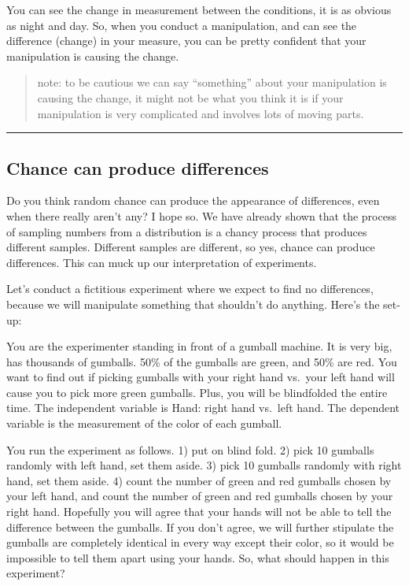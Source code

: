 \documentclass[]{book}
\begin{document}
You can see the change in measurement between the conditions, it is as obvious as night and day. So, when you conduct a manipulation, and can see the difference (change) in your measure, you can be pretty confident that your manipulation is causing the change.

\begin{quote}
note: to be cautious we can say ``something'' about your manipulation is causing the change, it might not be what you think it is if your manipulation is very complicated and involves lots of moving parts.
\end{quote}

\begin{center}\rule{0.5\linewidth}{0.5pt}\end{center}

\hypertarget{chance-can-produce-differences}{%
\subsection{Chance can produce differences}\label{chance-can-produce-differences}}

Do you think random chance can produce the appearance of differences, even when there really aren't any? I hope so. We have already shown that the process of sampling numbers from a distribution is a chancy process that produces different samples. Different samples are different, so yes, chance can produce differences. This can muck up our interpretation of experiments.

Let's conduct a fictitious experiment where we expect to find no differences, because we will manipulate something that shouldn't do anything. Here's the set-up:

You are the experimenter standing in front of a gumball machine. It is very big, has thousands of gumballs. 50\% of the gumballs are green, and 50\% are red. You want to find out if picking gumballs with your right hand vs.~your left hand will cause you to pick more green gumballs. Plus, you will be blindfolded the entire time. The independent variable is Hand: right hand vs.~left hand. The dependent variable is the measurement of the color of each gumball.

You run the experiment as follows. 1) put on blind fold. 2) pick 10 gumballs randomly with left hand, set them aside. 3) pick 10 gumballs randomly with right hand, set them aside. 4) count the number of green and red gumballs chosen by your left hand, and count the number of green and red gumballs chosen by your right hand. Hopefully you will agree that your hands will not be able to tell the difference between the gumballs. If you don't agree, we will further stipulate the gumballs are completely identical in every way except their color, so it would be impossible to tell them apart using your hands. So, what should happen in this experiment?
\end{document}
